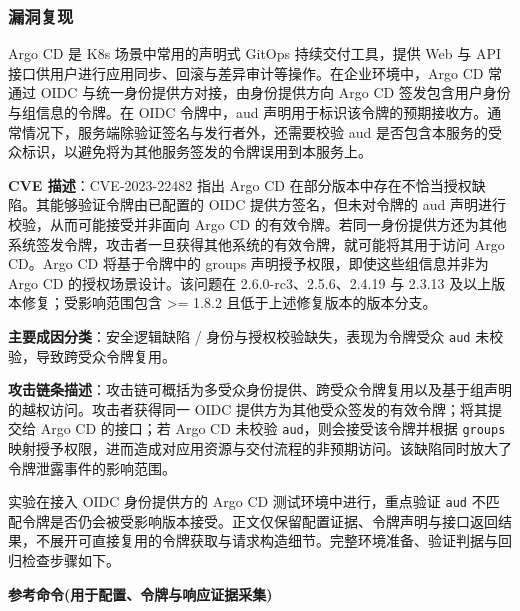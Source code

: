 
\subsubsection{漏洞复现}

Argo CD 是 K8s 场景中常用的声明式 GitOps 持续交付工具，提供 Web 与 API 接口供用户进行应用同步、回滚与差异审计等操作。在企业环境中，Argo CD 常通过 OIDC 与统一身份提供方对接，由身份提供方向 Argo CD 签发包含用户身份与组信息的令牌。在 OIDC 令牌中，aud 声明用于标识该令牌的预期接收方。通常情况下，服务端除验证签名与发行者外，还需要校验 aud 是否包含本服务的受众标识，以避免将为其他服务签发的令牌误用到本服务上。

\textbf{CVE 描述}：CVE-2023-22482 指出 Argo CD 在部分版本中存在不恰当授权缺陷。其能够验证令牌由已配置的 OIDC 提供方签名，但未对令牌的 aud 声明进行校验，从而可能接受并非面向 Argo CD 的有效令牌。若同一身份提供方还为其他系统签发令牌，攻击者一旦获得其他系统的有效令牌，就可能将其用于访问 Argo CD。Argo CD 将基于令牌中的 groups 声明授予权限，即使这些组信息并非为 Argo CD 的授权场景设计。该问题在 2.6.0-rc3、2.5.6、2.4.19 与 2.3.13 及以上版本修复；受影响范围包含 >= 1.8.2 且低于上述修复版本的版本分支。

\textbf{主要成因分类}：安全逻辑缺陷 / 身份与授权校验缺失，表现为令牌受众 \texttt{aud} 未校验，导致跨受众令牌复用。

\textbf{攻击链条描述}：攻击链可概括为多受众身份提供、跨受众令牌复用以及基于组声明的越权访问。攻击者获得同一 OIDC 提供方为其他受众签发的有效令牌；将其提交给 Argo CD 的接口；若 Argo CD 未校验 \texttt{aud}，则会接受该令牌并根据 \texttt{groups} 映射授予权限，进而造成对应用资源与交付流程的非预期访问。该缺陷同时放大了令牌泄露事件的影响范围。


实验在接入 OIDC 身份提供方的 Argo CD 测试环境中进行，重点验证 \texttt{aud} 不匹配令牌是否仍会被受影响版本接受。正文仅保留配置证据、令牌声明与接口返回结果，不展开可直接复用的令牌获取与请求构造细节。完整环境准备、验证判据与回归检查步骤如下。


\textbf{参考命令(用于配置、令牌与响应证据采集)}

